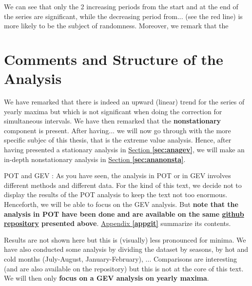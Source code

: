 We can see that only the 2 increasing periods from the start and at the end of the series are significant, while the decreasing period from... (see the red line) is more likely to be the subject of randomness. Moreover, we remark that the 


\section{Comments and Structure of the Analysis }

 We have remarked that there is indeed an upward (linear) trend for the series of yearly maxima but which is not significant when doing the correction for simultaneous intervals.
We have then remarked that the \textbf{nonstationary} component is present. After having... we will now go through with the more specific subjec of this thesis, that is the extreme value analysis. Hence, after having presented a stationary analysis in \hyperref[sec:anagev]{Section \textbf{\ref{sec:anagev}}}, we will make an in-depth nonstationary analysis in \hyperref[sec:ananonsta]{Section \textbf{\ref{sec:ananonsta}}}.


POT and GEV : 
As you have seen, the analysis in POT or in GEV involves different methods and different data. For the kind of this text, we decide not to display the results of the POT analysis to keep the text not too enormous. Henceforth, we will be able to focus on the GEV analysis. But\textbf{ note that the analysis in POT have been done and are available on the same \hyperref[xxx]{github repository} presented above}.
\hyperref[appgit]{Appendix\textbf{ \ref{appgit}}} summarize its contents.


Results are not shown here but this is (visually) less pronounced for minima. We have also conducted some analysis by dividing the dataset by seasons, by hot and cold months (July-August, January-February), ... 
Comparisons are interesting (and are also available on the repository) but this is not at the core of this text. 
We will then only \textbf{focus on a GEV analysis on yearly maxima}.